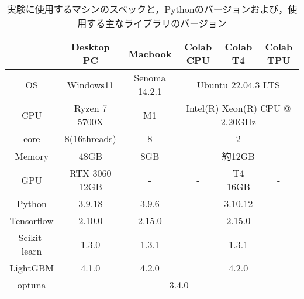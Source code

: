 \begin{table}
    \centering
    \caption{実験に使用するマシンのスペックと，Pythonのバージョンおよび，使用する主なライブラリのバージョン}
    \label{tab:spec}
    \begin{tabular}{|c|ccccc|}
        \hline
                     & \multicolumn{1}{c|}{Desktop PC}    & \multicolumn{1}{c|}{Macbook}       & \multicolumn{1}{c|}{Colab CPU} & \multicolumn{1}{c|}{Colab T4} & Colab TPU \\ \hline
        OS           & \multicolumn{1}{c|}{Windows11}     & \multicolumn{1}{c|}{Senoma 14.2.1} & \multicolumn{3}{c|}{Ubuntu 22.04.3 LTS}                                    \\ \hline
        CPU          & \multicolumn{1}{c|}{Ryzen 7 5700X} & \multicolumn{1}{c|}{M1}            & \multicolumn{3}{c|}{Intel(R) Xeon(R) CPU @ 2.20GHz}                        \\ \hline
        core         & \multicolumn{1}{c|}{8(16threads)}  & \multicolumn{1}{c|}{8}             & \multicolumn{3}{c|}{2}                                                     \\ \hline
        Memory       & \multicolumn{1}{c|}{48GB}          & \multicolumn{1}{c|}{8GB}           & \multicolumn{3}{c|}{約12GB}                                                 \\ \hline
        GPU          & \multicolumn{1}{c|}{RTX 3060 12GB} & \multicolumn{1}{c|}{-}             & \multicolumn{1}{c|}{-}         & \multicolumn{1}{c|}{T4 16GB}  & -         \\ \hline
        Python       & \multicolumn{1}{c|}{3.9.18}        & \multicolumn{1}{c|}{3.9.6}         & \multicolumn{3}{c|}{3.10.12}                                               \\ \hline
        Tensorflow   & \multicolumn{1}{c|}{2.10.0}        & \multicolumn{1}{c|}{2.15.0}        & \multicolumn{3}{c|}{2.15.0}                                                \\ \hline
        Scikit-learn & \multicolumn{1}{c|}{1.3.0}         & \multicolumn{1}{c|}{1.3.1}         & \multicolumn{3}{c|}{1.3.1}                                                 \\ \hline
        LightGBM     & \multicolumn{1}{c|}{4.1.0}         & \multicolumn{1}{c|}{4.2.0}         & \multicolumn{3}{c|}{4.2.0}                                                 \\ \hline
        optuna       & \multicolumn{5}{c|}{3.4.0}                                                                                                                           \\ \hline
        \end{tabular}
\end{table}
